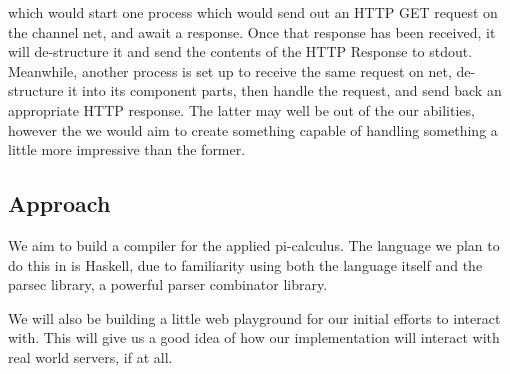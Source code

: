 which would start one process which would send  out an HTTP GET request on the channel net, and await a response. Once that response has been received, it will de-structure it and send the contents of the HTTP Response to stdout. Meanwhile, another process is set up to receive the same request on net, de-structure it into its component parts, then handle the request, and send back an appropriate HTTP response. The latter may well be out of the our abilities, however the we would aim to create something capable of handling something a little more impressive than the former.

\subsection{Approach}

We aim to build a compiler for the applied pi-calculus. The language we plan to do this in is Haskell, due to familiarity using both the language itself and the parsec library, a powerful parser combinator library. 

We will also be building a little web playground for our initial efforts to interact with. This will give us a good idea of how our implementation will interact with real world servers, if at all. 

